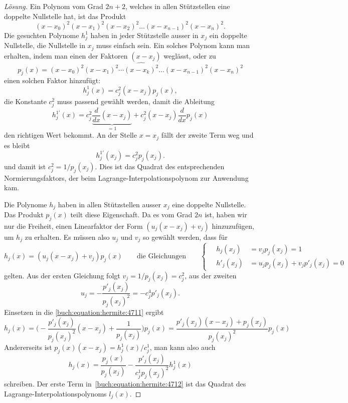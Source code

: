 \begin{proof}[Lösung]
Ein Polynom vom Grad $2n+2$, welches in allen Stützstellen eine 
doppelte Nullstelle hat, ist das Produkt
\[
(x-x_0)^2 (x-x_1)^2 (x-x_2)^2 \dots (x-x_{n-1})^2 (x-x_n)^2.
\]
Die gesuchten Polynome $h^1_j$ haben in jeder Stützstelle ausser in $x_j$
ein doppelte Nullstelle, die Nullstelle in $x_j$ muss einfach sein.
Ein solches Polynom kann man erhalten, indem man einen der
Faktoren $(x-x_j)$ weglässt, oder zu
\[
p_j(x)
=
(x-x_0)^2 (x-x_1)^2 \cdots \widehat{(x-x_k)^2} \dots (x-x_{n-1})^2(x-x_n)^2
\]
einen solchen Faktor hinzufügt:
\[
h_j^1(x)
=
c_j^2 (x-x_j) p_j(x),
\]
die Konstante $c_j^2$ muss passend gewählt werden, damit die Ableitung
\[
h_j^{1\prime}(x)
=
c_j^2 \underbrace{\frac{d}{dx}(x-x_j)}_{\displaystyle=1}
+
c_j^2
(x-x_j)
\frac{d}{dx} p_j(x)
\]
den richtigen Wert bekommt.
An der Stelle $x=x_j$ fällt der zweite Term weg und es bleibt
\[
h_j^{1\prime}(x_j)
=
c_j^2 p_j(x_j).
\]
und damit ist $c_j^2 = 1/p_j(x_j)$.
Dies ist das Quadrat des entsprechenden Normierungsfaktors, der beim
Lagrange-Interpolationspolynom zur Anwendung kam.

Die Polynome $h_j$ haben in allen Stützstellen ausser $x_j$ eine doppelte
Nullstelle.
Das Produkt $p_j(x)$ teilt diese Eigenschaft.
Da es vom Grad $2n$ ist, haben wir nur die Freiheit, einen Linearfaktor
der Form $(u_j(x-x_j)+v_j)$ hinzuzufügen, um $h_j$ zu erhalten.
Es müssen also $u_j$ und $v_j$ so gewählt werden, dass für
\begin{equation}
h_j(x)=(u_j(x-x_j)+v_j) p_j(x)
\qquad
\text{die Gleichungen}
\qquad
\left\{
\quad
\begin{aligned}
h_j(x_j) &= v_j p_j(x_j) = 1\\
h'_j(x_j) &= u_j p_j(x_j) + v_j p'_j(x_j)=0
\end{aligned}
\right.
\label{buch:equation:hermite:4711}
\end{equation}
gelten.
Aus der ersten Gleichung folgt $ v_j = 1/p_j(x_j) = c_j^2$, aus der zweiten
\[
u_j
=
-\frac{p'_j(x_j)}{p_j(x_j)^2}
=
- c_j^4 p'_j(x_j).
\]
Einsetzen in die \eqref{buch:equation:hermite:4711} ergibt
\[
h_j(x) = \biggl(-
\frac{p'_j(x_j)}{p_j(x_j)^2} (x-x_j) + \frac{1}{p_j(x_j)}\biggr) p_j(x)
=
\frac{p'_j(x_j)(x-x_j) + p_j(x_j)}{p_j(x_j)^2}p_j(x)
\]
Andererseits ist $p_j(x)(x-x_j)=h^1_j(x)/c_j^1$, man kann also auch
\begin{equation}
h_j(x)  
=
\frac{p_j(x)}{p_j(x_j)}
-
\frac{p'_j(x_j)}{c_j^1p_j(x_j)^2} h_j^1(x)
\label{buch:equation:hermite:4712}
\end{equation}
schreiben.
Der erste Term in~\eqref{buch:equation:hermite:4712} ist das Quadrat
des Lagrange-Interpolationspolynoms $l_j(x)$. 
\end{proof}

